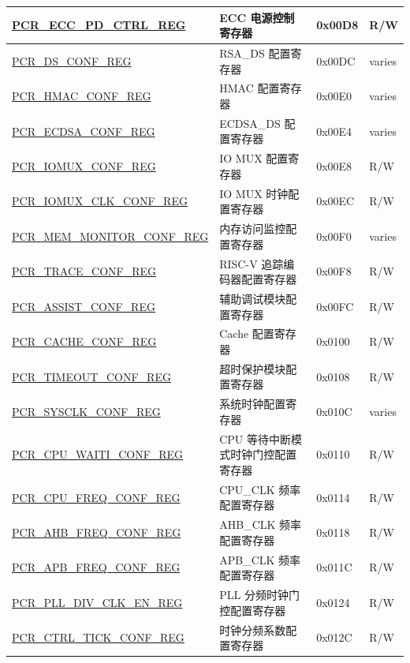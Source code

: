 \begin{longtable}{ | p{7.2cm} | p{6cm} | p{1.3cm} | p{1cm} | }
\hyperref[regdesc:PCRECCPDCTRLREG]{PCR\_ECC\_PD\_CTRL\_REG} & ECC 电源控制寄存器 & 0x00D8 & R/W \\ \hline
\hyperref[regdesc:PCRDSCONFREG]{PCR\_DS\_CONF\_REG} & RSA\_DS 配置寄存器 & 0x00DC & varies \\ \hline
\hyperref[regdesc:PCRHMACCONFREG]{PCR\_HMAC\_CONF\_REG} & HMAC 配置寄存器 & 0x00E0 & varies \\ \hline
\hyperref[regdesc:PCRECDSACONFREG]{PCR\_ECDSA\_CONF\_REG} & ECDSA\_DS 配置寄存器 & 0x00E4 & varies \\ \hline
\hyperref[regdesc:PCRIOMUXCONFREG]{PCR\_IOMUX\_CONF\_REG} & IO MUX 配置寄存器 & 0x00E8 & R/W \\ \hline
\hyperref[regdesc:PCRIOMUXCLKCONFREG]{PCR\_IOMUX\_CLK\_CONF\_REG} & IO MUX 时钟配置寄存器 & 0x00EC & R/W \\ \hline
\hyperref[regdesc:PCRMEMMONITORCONFREG]{PCR\_MEM\_MONITOR\_CONF\_REG} & 内存访问监控配置寄存器 & 0x00F0 & varies \\ \hline
\hyperref[regdesc:PCRTRACECONFREG]{PCR\_TRACE\_CONF\_REG} & RISC-V 追踪编码器配置寄存器 & 0x00F8 & R/W \\ \hline
\hyperref[regdesc:PCRASSISTCONFREG]{PCR\_ASSIST\_CONF\_REG} & 辅助调试模块配置寄存器 & 0x00FC & R/W \\ \hline
\hyperref[regdesc:PCRCACHECONFREG]{PCR\_CACHE\_CONF\_REG} & Cache 配置寄存器 & 0x0100 & R/W \\ \hline
\hyperref[regdesc:PCRTIMEOUTCONFREG]{PCR\_TIMEOUT\_CONF\_REG} & 超时保护模块配置寄存器 & 0x0108 & R/W \\ \hline
\hyperref[regdesc:PCRSYSCLKCONFREG]{PCR\_SYSCLK\_CONF\_REG} & 系统时钟配置寄存器 & 0x010C & varies \\ \hline
\hyperref[regdesc:PCRCPUWAITICONFREG]{PCR\_CPU\_WAITI\_CONF\_REG} & CPU 等待中断模式时钟门控配置寄存器 & 0x0110 & R/W \\ \hline
\hyperref[regdesc:PCRCPUFREQCONFREG]{PCR\_CPU\_FREQ\_CONF\_REG} & CPU\_CLK 频率配置寄存器 & 0x0114 & R/W \\ \hline
\hyperref[regdesc:PCRAHBFREQCONFREG]{PCR\_AHB\_FREQ\_CONF\_REG} & AHB\_CLK 频率配置寄存器 & 0x0118 & R/W \\ \hline
\hyperref[regdesc:PCRAPBFREQCONFREG]{PCR\_APB\_FREQ\_CONF\_REG} & APB\_CLK 频率配置寄存器 & 0x011C & R/W \\ \hline
\hyperref[regdesc:PCRPLLDIVCLKENREG]{PCR\_PLL\_DIV\_CLK\_EN\_REG} & PLL 分频时钟门控配置寄存器 & 0x0124 & R/W \\ \hline
\hyperref[regdesc:PCRCTRLTICKCONFREG]{PCR\_CTRL\_TICK\_CONF\_REG} & 时钟分频系数配置寄存器 & 0x012C & R/W \\ \hline

\end{longtable}
